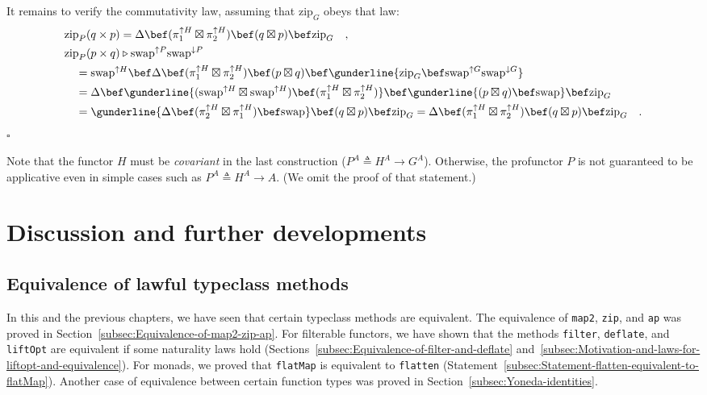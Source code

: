 It remains to verify the commutativity law, assuming that $\text{zip}_{G}$
obeys that law:
\begin{align*}
 & \text{zip}_{P}(q\times p)=\Delta\bef(\pi_{1}^{\uparrow H}\boxtimes\pi_{2}^{\uparrow H})\bef(q\boxtimes p)\bef\text{zip}_{G}\quad,\\
 & \text{zip}_{P}(p\times q)\triangleright\text{swap}^{\uparrow P}\text{swap}^{\downarrow P}\\
 & \quad=\text{swap}^{\uparrow H}\bef\Delta\bef(\pi_{1}^{\uparrow H}\boxtimes\pi_{2}^{\uparrow H})\bef(p\boxtimes q)\bef\gunderline{\text{zip}_{G}\bef\text{swap}^{\uparrow G}\text{swap}^{\downarrow G}}\\
 & \quad=\Delta\bef\gunderline{(\text{swap}^{\uparrow H}\boxtimes\text{swap}^{\uparrow H})\bef(\pi_{1}^{\uparrow H}\boxtimes\pi_{2}^{\uparrow H})}\bef\gunderline{(p\boxtimes q)\bef\text{swap}}\bef\text{zip}_{G}\\
 & \quad=\gunderline{\Delta\bef(\pi_{2}^{\uparrow H}\boxtimes\pi_{1}^{\uparrow H})\bef\text{swap}}\bef(q\boxtimes p)\bef\text{zip}_{G}=\Delta\bef(\pi_{1}^{\uparrow H}\boxtimes\pi_{2}^{\uparrow H})\bef(q\boxtimes p)\bef\text{zip}_{G}\quad.
\end{align*}
$\square$

Note that the functor $H$ must be \emph{covariant} in the last construction
($P^{A}\triangleq H^{A}\rightarrow G^{A}$). Otherwise, the profunctor
$P$ is not guaranteed to be applicative even in simple cases such
as $P^{A}\triangleq H^{A}\rightarrow A$. (We omit the proof of that
statement.)

\section{Discussion and further developments}

\subsection{Equivalence of lawful typeclass methods}

In this and the previous chapters, we have seen that certain typeclass
methods are equivalent. The equivalence of \lstinline!map2!, \lstinline!zip!,
and \lstinline!ap! was proved in Section~\ref{subsec:Equivalence-of-map2-zip-ap}.
For filterable functors, we have shown that the methods \lstinline!filter!,
\lstinline!deflate!, and \lstinline!liftOpt! are equivalent if some
naturality laws hold (Sections~\ref{subsec:Equivalence-of-filter-and-deflate}
and~\ref{subsec:Motivation-and-laws-for-liftopt-and-equivalence}).
For monads, we proved that \lstinline!flatMap! is equivalent to \lstinline!flatten!
(Statement~\ref{subsec:Statement-flatten-equivalent-to-flatMap}).
Another case of equivalence between certain function types was proved
in Section~\ref{subsec:Yoneda-identities}. 

